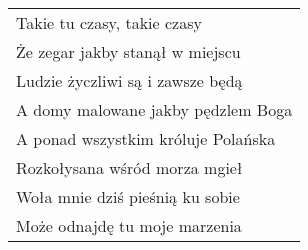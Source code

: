 \documentclass[a5paper]{article}
\begin{document}
\noindent
\begin{tabular}{@{}p{7.50cm}@{}}
Takie tu czasy, takie czasy \\
Że zegar jakby stanął w miejscu \\
Ludzie życzliwi są i zawsze będą \\
A domy malowane jakby pędzlem Boga \\
A ponad wszystkim króluje Polańska \\
Rozkołysana wśród morza mgieł \\
Woła mnie dziś pieśnią ku sobie \\
Może odnajdę tu moje marzenia
\end{tabular}
\end{document}
